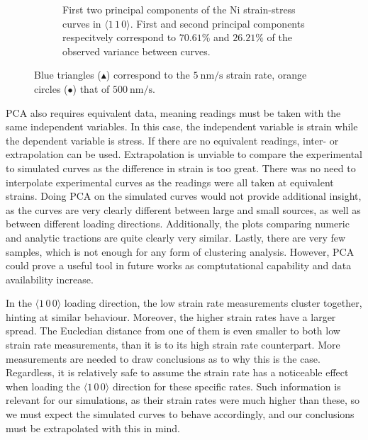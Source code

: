 \begin{figure}[t]
\begin{subfigure}[t]{0.45\linewidth}
        \caption[First two principal components of the Ni strain-stress curves in $\langle 1\,1\,0 \rangle$.]{First two principal components of the Ni strain-stress curves in $\langle 1\,1\,0 \rangle$. First and second principal components respecitvely correspond to $70.61\%$ and $26.21\%$ of the observed variance between curves.}
        \label{sf:Ni110_pca}
    \end{subfigure}
    \caption{Blue triangles (\textcolor{matlabBlue}{$\blacktriangle$}) correspond to the $\SI{5}{\nano\metre\per\second}$ strain rate, orange circles (\textcolor{matlabOrange}{$\bullet$}) that of $\SI{500}{\nano\metre\per\second}$.}
    \label{f:Ni_pca}
\end{figure}

PCA also requires equivalent data, meaning readings must be taken with the same independent variables. In this case, the independent variable is strain while the dependent variable is stress. If there are no equivalent readings, inter- or extrapolation can be used. Extrapolation is unviable to compare the experimental to simulated curves as the difference in strain is too great. There was no need to interpolate experimental curves as the readings were all taken at equivalent strains. Doing PCA on the simulated curves would not provide additional insight, as the curves are very clearly different between large and small sources, as well as between different loading directions. Additionally, the plots comparing numeric and analytic tractions are quite clearly very similar. Lastly, there are very few samples, which is not enough for any form of clustering analysis. However, PCA could prove a useful tool in future works as comptutational capability and data availability increase.

In the $\langle 1\, 0\, 0 \rangle$ loading direction, the low strain rate measurements cluster together, hinting at similar behaviour. Moreover, the higher strain rates have a larger spread. The Eucledian distance from one of them is even smaller to both low strain rate measurements, than it is to its high strain rate counterpart. More measurements are needed to draw conclusions as to why this is the case. Regardless, it is relatively safe to assume the strain rate has a noticeable effect when loading the $\langle 1\, 0\, 0 \rangle$ direction for these specific rates. Such information is relevant for our simulations, as their strain rates were much higher than these, so we must expect the simulated curves to behave accordingly, and our conclusions must be extrapolated with this in mind.

